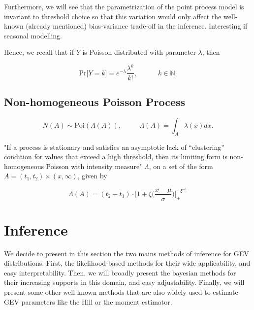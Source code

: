 Furthermore, we will see that the parametrization of the point process model is invariant to threshold choice %
so that this variation would only affect the well-known (already mentioned) bias-variance trade-off in the inference. Interesting if seasonal modelling.




Hence, we recall that if $Y$ is Poisson distributed with parameter $\lambda$, then 

\begin{equation}\label{poissdist}
\text{Pr}\big[Y=k\big]= e^{-\lambda}\frac{\lambda^k}{k!}, \qquad\quad k\in\mathbb{N.}
\end{equation}


\subsection{Non-homogeneous Poisson Process} 

\begin{equation}
N(A)\sim \text{Poi}(\Lambda(A)), \ \ \ \ \ \ \ \,\ \ \ \ \Lambda (A) = \int_A \lambda (x)dx.
\end{equation}


 "If a process is stationary and satisfies an asymptotic
lack of “clustering” condition for values that exceed a high threshold, then its limiting form is
non-homogeneous Poisson with intensity measure" $\Lambda$, on a set of the form $A = (t_1,t_2)\times (x,\infty)$, given by 

\begin{equation}
\Lambda(A) = (t_2-t_1)\cdot\bigg[1+\xi\bigg(\frac{x-\mu}{\sigma}\bigg)\bigg]^{-\xi^{-1}}_+
\end{equation}





\section{Inference}\label{sec::potinfernce} 


\iffalse
We decide to present in this section the two mains methods of inference for GEV distributions. First, the likelihood-based methods for their wide applicability, and easy interpretability. Then, we will broadly present the bayesian methods for their increasing supports in this domain, and easy adjustability. Finally, we will present some other well-known methods that are also widely used to estimate GEV parameters like the Hill or the moment estimator.

